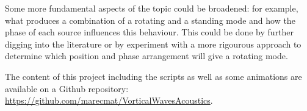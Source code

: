 \documentclass[%
 reprint,
 amsmath,amssymb,
 aps,
]{revtex4-2}
\begin{document}
Some more fundamental aspects of the topic could be broadened: for example, what produces a combination of a rotating and a standing mode and how the phase of each source influences this behaviour. This could be done by further digging into the literature or by experiment with a more rigourous approach to determine which position and phase arrangement will give a rotating mode. 

The content of this project including the scripts as well as some animations are available on a Github repository: \url{https://github.com/marecmat/VorticalWavesAcoustics}.


\end{document}
